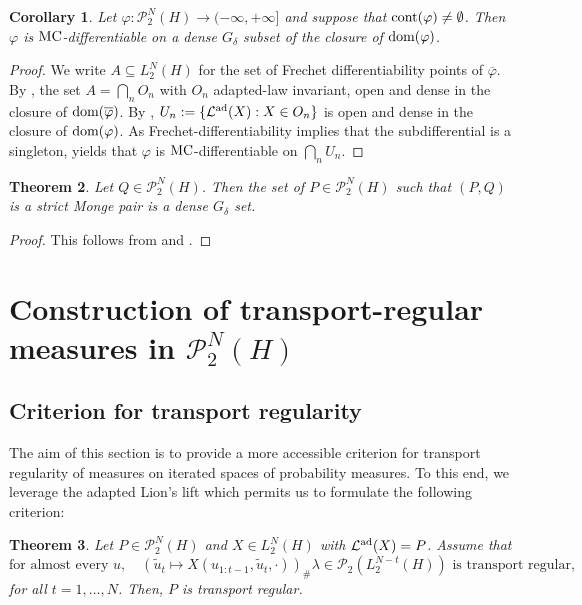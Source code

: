 \documentclass[a4paper]{amsart}
\newtheorem{theorem}{Theorem}
\numberwithin{theorem}{section}
\newtheorem{corollary}[theorem]{Corollary}
\theoremstyle{definition}
\newcommand{\law}{\mathcal{L}}
\newcommand{\dom}{\textup{dom}}
\newcommand{\Pc}{\mathcal P}
\renewcommand{\subset}{\subseteq}
\newcommand{\cont}{\textup{cont}}
\renewcommand{\H}{H}
\renewcommand{\phi}{\varphi}
\newcommand{\mc}{\textup{MC}}
\newcommand{\lawad}{\law^{\textup{ad}}}
\begin{document}
\begin{corollary}\label{cor:MCdfb_Gdelta}
Let $\phi : \Pc_2^N(\H) \to (-\infty,+\infty]$ and suppose that $\cont(\phi)\neq\emptyset$. Then $\phi$ is $\mc$-differentiable on a dense $G_\delta$ subset of the closure of $\dom(\phi)$. 
\end{corollary}
\begin{proof}
We write $A \subset L_2^N(\H)$ for the set of Frechet differentiability points of $\overline{\phi}$. By , the set $A = \bigcap_n O_n$ with $O_n$ adapted-law invariant, open and dense in the closure  of $\dom(\overline{\phi})$. By , $U_n := \{ \lawad(X) : X \in O_n \}$ is open and dense in the closure of $\dom(\phi)$. As Frechet-differentiability implies that the subdifferential is a singleton,  yields that $\phi$ is $\mc$-differentiable on $\bigcap_n U_n$.  
\end{proof}

\begin{theorem}
Let $Q \in \Pc_2^N(\H)$. Then the set of $P \in \Pc_2^N(\H)$ such that $(P,Q)$ is a strict Monge pair is a dense $G_\delta$ set.    
\end{theorem}
\begin{proof}
This follows from  and .     
\end{proof}





\section{Construction of transport-regular measures in $\Pc_2^N(\H)$}\label{sec:TR}

\subsection{Criterion for transport regularity}

The aim of this section is to provide a more accessible criterion for transport regularity of measures on iterated spaces of probability measures.
To this end, we leverage the adapted Lion's lift which permits us to formulate the following criterion:

\begin{theorem} \label{thm:char.TR}
    Let $P \in \Pc^N_2(\H)$ and $X \in L_2^N(\H)$ with $\lawad(X) = P$. 
    Assume that
    \begin{equation}
        \label{eq:thm.char.TR}
        \text{for almost every }u, \quad (\tilde u_t \mapsto X(u_{1:t-1},\tilde u_t,\cdot))_\# \lambda \in \Pc_{2}(L_2^{N-t}(H)) \text{ is transport regular},
    \end{equation}
    for all $t = 1,\dots,N$.
    Then, $P$ is transport regular.
\end{theorem}
\end{document}
